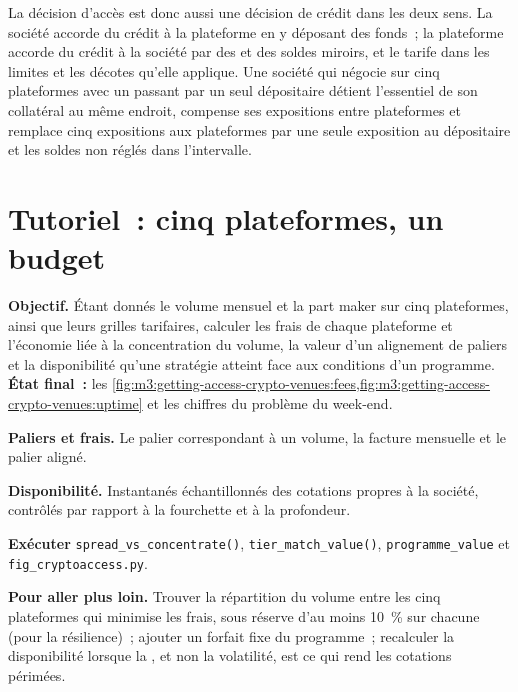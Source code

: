 La décision d'accès est donc aussi une décision de crédit dans les deux sens. La société accorde du crédit à la plateforme en y déposant des fonds~; la plateforme accorde du crédit
à la société par des  et des soldes miroirs, et le tarife dans les limites et les décotes qu'elle applique. Une société qui négocie sur cinq plateformes avec
un  passant par un seul dépositaire détient l'essentiel de son collatéral au même endroit, compense ses expositions entre plateformes et remplace cinq
expositions aux plateformes par une seule exposition au dépositaire et les soldes non réglés dans l'intervalle.

\section{Tutoriel~: cinq plateformes, un budget}\label{tut:m3:getting-access-crypto-venues:fees}

\begin{tutorial}
\textbf{Objectif.} Étant donnés le volume mensuel et la part maker sur cinq plateformes, ainsi que leurs grilles tarifaires, calculer les frais de chaque plateforme et
l'économie liée à la concentration du volume, la valeur d'un alignement de paliers et la disponibilité qu'une stratégie atteint face aux conditions d'un programme. \textbf{État final~:}
les \cref{fig:m3:getting-access-crypto-venues:fees,fig:m3:getting-access-crypto-venues:uptime} et les chiffres du problème du week-end.
\begin{tutsteps}
\item \textbf{Paliers et frais.} Le palier correspondant à un volume, la facture mensuelle et le palier aligné.
\label{lst:m3:getting-access-crypto-venues:fees}
\item \textbf{Disponibilité.} Instantanés échantillonnés des cotations propres à la société, contrôlés par rapport à la fourchette et à la profondeur.
\label{lst:m3:getting-access-crypto-venues:uptime}
\item \textbf{Exécuter} \texttt{spread\_vs\_concentrate()}, \texttt{tier\_match\_value()}, \texttt{programme\_value} et \texttt{fig\_cryptoaccess.py}.
\end{tutsteps}
\textbf{Pour aller plus loin.} Trouver la répartition du volume entre les cinq plateformes qui minimise les frais, sous réserve d'au moins 10~\% sur chacune (pour la résilience)~; ajouter un
forfait fixe du programme~; recalculer la disponibilité lorsque la , et non la volatilité, est ce qui rend les cotations périmées.
\end{tutorial}

